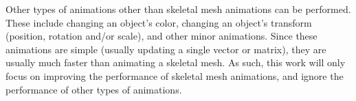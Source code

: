 Other types of animations other than skeletal mesh animations can be performed.
These include changing an object's color, changing an object's transform (position, rotation and/or scale), and other minor animations.
Since these animations are simple (usually updating a single vector or matrix), they are usually much faster than animating a skeletal mesh.
As such, this work will only focus on improving the performance of skeletal mesh animations, and ignore the performance of other types of animations.

%

%
